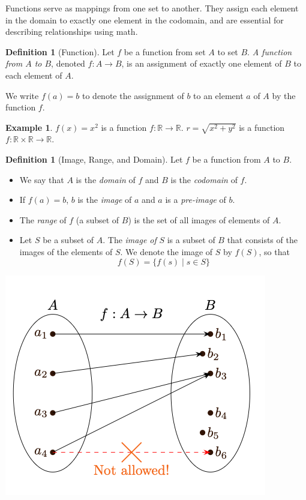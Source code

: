 \documentclass[12pt]{article}
\theoremstyle{definition}
\newtheorem{definition}[theorem]{Definition}
\newtheorem*{example}{Example}
\begin{document}
Functions serve as mappings from one set to another. They assign each element in the domain to exactly one element in the codomain, and are essential for describing relationships using math. 

\begin{definition}[Function]
Let $f$ be a function from set $A$ to set $B$. \textit{A function from $A$ to $B$}, denoted $f : A \to B$, is an assignment of exactly one element of $B$ to each element of $A$. 
\end{definition}

We write $f(a) = b$ to denote the assignment of $b$ to an element $a$ of $A$ by the function $f$.

\begin{example}
$f(x) = x^2$ is a function $f : \mathbb{R} \rightarrow \mathbb{R}$. \quad $r = \sqrt{x^2 + y^2}$ is a function $f : \mathbb{R} \times \mathbb{R} \rightarrow \mathbb{R}$.
\end{example}

\begin{definition}[Image, Range, and Domain]
Let $f$ be a function from $A$ to $B$.
    \begin{itemize}
        \item We say that $A$ is the \textit{domain} of $f$ and $B$ is the \textit{codomain} of $f$.
        \item If $f(a) = b$, $b$ is the \textit{image} of $a$ and $a$ is a \textit{pre-image} of $b$.
        \item The \textit{range} of $f$ (a subset of $B$) is the set of all images of elements of $A$.
        \item Let $S$ be a subset of $A$. The \textit{image of} $S$ is a subset of $B$ that consists of the images of the elements of $S$. We denote the image of $S$ by $f(S)$, so that $$f(S) = \{ f(s) \mid s \in S \}$$
    \end{itemize}
\end{definition}

\begin{center}
    \includegraphics[width=\textwidth/2]{4_func0}
\end{center}
\end{document}
